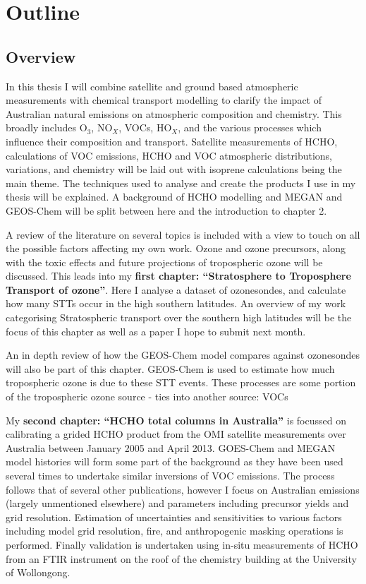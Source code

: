 \chapter{Outline}

  \section{Overview}
    In this thesis I will combine satellite and ground based atmospheric measurements with chemical transport modelling to clarify the impact of Australian natural emissions on atmospheric composition and chemistry.
    This broadly includes O$_3$, NO$_X$, VOCs, HO$_X$, and the various processes which influence their composition and transport.
    Satellite measurements of HCHO, calculations of VOC emissions, HCHO and VOC atmospheric distributions, variations, and chemistry will be laid out with isoprene calculations being the main theme.
    The techniques used to analyse and create the products I use in my thesis will be explained.
    A background of HCHO modelling and MEGAN and GEOS-Chem will be split between here and the introduction to chapter 2.

    A review of the literature on several topics is included with a view to touch on all the possible factors affecting my own work.
    Ozone and ozone precursors, along with the toxic effects and future projections of tropospheric ozone will be discussed.
    This leads into my \textbf{first chapter: ``Stratosphere to Troposphere Transport of ozone''}.
    Here I analyse a dataset of ozonesondes, and calculate how many STTs occur in the high southern latitudes.
    An overview of my work categorising Stratospheric transport over the southern high latitudes will be the focus of this chapter as well as a paper I hope to submit next month.
    
    An in depth review of how the GEOS-Chem model compares against ozonesondes will also be part of this chapter.
    GEOS-Chem is used to estimate how much tropospheric ozone is due to these STT events.
    These processes are some portion of the tropospheric ozone source - ties into another source: VOCs

    My \textbf{second chapter: ``HCHO total columns in Australia''} is focussed on calibrating a grided HCHO product from the OMI satellite measurements over Australia between January 2005 and April 2013.
    GOES-Chem and MEGAN model histories will form some part of the background as they have been used several times to undertake similar inversions of VOC emissions.
    The process follows that of several other publications, however I focus on Australian emissions (largely unmentioned elsewhere) and parameters including precursor yields and grid resolution.
    Estimation of uncertainties and sensitivities to various factors including model grid resolution, fire, and anthropogenic masking operations is performed.
    Finally validation is undertaken using in-situ measurements of HCHO from an FTIR instrument on the roof of the chemistry building at the University of Wollongong.
    
